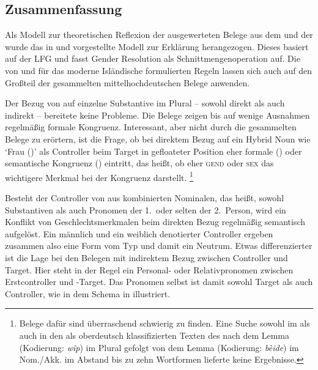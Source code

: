 \subsection{Zusammenfassung}

Als Modell zur theoretischen Reflexion der ausgewerteten Belege aus dem
\CAO{} und der \KC{} wurde das in \citet{wechsler2009} und
\citet{wechslerzlatic2003} vorgestellte Modell zur Erklärung herangezogen.
Dieses basiert auf der LFG und fasst Gender Resolution als
Schnittmengenoperation auf. Die von \citet[578]{wechsler2009} und
\citet[186]{wechslerzlatic2003} für das moderne Isländische formulierten Regeln
lassen sich auch auf den Großteil der gesammelten
mittelhochdeutschen Belege anwenden.

Der Bezug von  auf einzelne Substantive im Plural -- sowohl direkt
als auch indirekt -- bereitete keine Probleme. Die Belege zeigen bis auf wenige
Ausnahmen regelmäßig formale Kongruenz. Interessant, aber nicht durch die
gesammelten Belege zu erörtern, ist die Frage, ob bei direktem Bezug auf ein
Hybrid Noun wie  `Frau (\NeutF)' als Controller beim Target in
gefloateter Position eher formale () oder semantische Kongruenz
() eintritt, das heißt, ob eher \textsc{gend} oder \textsc{sex} das
wichtigere Merkmal bei der Kongruenz darstellt.%
%
	\footnote{Belege dafür sind überraschend schwierig zu finden. Eine Suche
		sowohl im \CAO{} als auch in den als oberdeutsch klassifizierten Texten
		des \REM{} nach dem Lemma  (Kodierung: \emph{wîp}) im
		Plural gefolgt von dem Lemma  (Kodierung: \emph{bèide})
		im Nom./Akk. im Abstand bis zu zehn Wortformen lieferte keine
		Ergebnisse.}

Besteht der Controller von  aus kombinierten Nominalen, das heißt,
sowohl Substantiven als auch Pronomen der 1.\ oder selten der 2.\ Person, wird
ein Konflikt von Geschlechtsmerkmalen beim direkten Bezug regelmäßig semantisch
aufgelöst. Ein männlich und ein weiblich denotierter Controller ergeben
zusammen also eine Form vom Typ  und damit ein Neutrum. Etwas
differenzierter ist die Lage bei den Belegen mit indirektem Bezug zwischen
Controller und Target. Hier steht in der Regel ein Personal- oder
Relativpronomen zwischen Erstcontroller und -Target. Das Pronomen
selbst ist damit sowohl Target als auch Controller, wie in dem Schema in
 illustriert.

